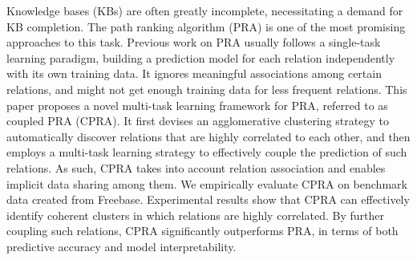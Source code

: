 Knowledge bases (KBs) are often greatly incomplete, necessitating a demand for KB completion. The path ranking algorithm (PRA) is one of the most promising approaches to this task. Previous work on PRA usually follows a single-task learning paradigm, building a prediction model for each relation independently with its own training data. It ignores meaningful associations among certain relations, and might not get enough training data for less frequent relations. This paper proposes a novel multi-task learning framework for PRA, referred to as coupled PRA (CPRA). It first devises an agglomerative clustering strategy to automatically discover relations that are highly correlated to each other, and then employs a multi-task learning strategy to effectively couple the prediction of such relations. As such, CPRA takes into account relation association and enables implicit data sharing among them. We empirically evaluate CPRA on benchmark data created from Freebase. Experimental results show that CPRA can effectively identify coherent clusters in which relations are highly correlated. By further coupling such relations, CPRA significantly outperforms PRA, in terms of both predictive accuracy and model interpretability.
